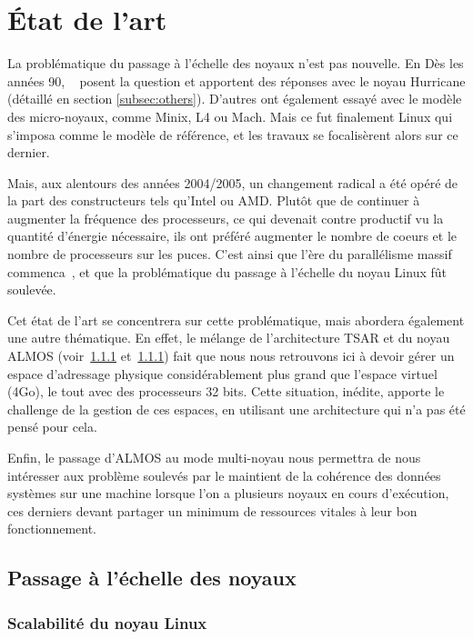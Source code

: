 \section{État de l’art}

  La problématique du passage à l’échelle des noyaux n’est pas nouvelle. En Dès
  les années 90, ~\citeauthor{unrau1995hierarchical} posent la question et
  apportent des réponses avec le noyau Hurricane (détaillé en section
  \ref{subsec:others}). D’autres ont également essayé avec le modèle des
  micro-noyaux, comme Minix, L4 ou Mach. Mais ce fut finalement Linux qui
  s’imposa comme le modèle de référence, et les travaux se focalisèrent alors
  sur ce dernier.

  Mais, aux alentours des années 2004/2005, un changement radical a été opéré de
  la part des constructeurs tels qu’Intel ou AMD. Plutôt que de continuer à
  augmenter la fréquence des processeurs, ce qui devenait contre productif vu la
  quantité d’énergie nécessaire, ils ont préféré augmenter le nombre de coeurs
  et le nombre de processeurs sur les puces. C’est ainsi que l’ère du
  parallélisme massif commenca~\citep{patterson2011parallel}, et que la
  problématique du passage à l’échelle du noyau Linux fût soulevée.

  Cet état de l'art se concentrera sur cette problématique, mais abordera
  également une autre thématique. En effet, le mélange de l'architecture TSAR et
  du noyau ALMOS (voir~\ref{} et~\ref{}) fait que nous nous retrouvons ici à
  devoir gérer un espace d'adressage physique considérablement plus grand que
  l'espace virtuel (4Go), le tout avec des processeurs 32 bits. Cette situation,
  inédite, apporte le challenge de la gestion de ces espaces, en utilisant une
  architecture qui n'a pas été pensé pour cela.
  
  Enfin, le passage d’ALMOS au mode multi-noyau nous permettra de nous
  intéresser aux problème soulevés par le maintient de la cohérence des données
  systèmes sur une machine lorsque l'on a plusieurs noyaux en cours d'exécution,
  ces derniers devant partager un minimum de ressources vitales à leur bon
  fonctionnement.

  \subsection{Passage à l’échelle des noyaux}
  \label{sec:scalability}

    \subsubsection{Scalabilité du noyau Linux}

